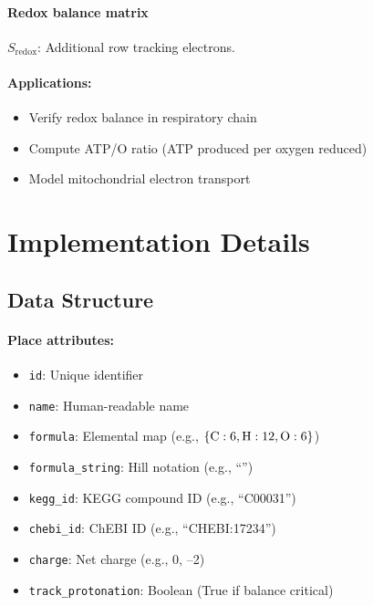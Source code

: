 \paragraph{Redox balance matrix} $S_{\text{redox}}$: Additional row tracking electrons.

\paragraph{Applications:}
\begin{itemize}
    \item Verify redox balance in respiratory chain
    \item Compute ATP/O ratio (ATP produced per oxygen reduced)
    \item Model mitochondrial electron transport
\end{itemize}

\section{Implementation Details}
\label{sec:formula-implementation}

\subsection{Data Structure}
\label{subsec:formula-data-structure}

\paragraph{Place attributes:}
\begin{itemize}
    \item \texttt{id}: Unique identifier
    \item \texttt{name}: Human-readable name
    \item \texttt{formula}: Elemental map (e.g., $\{\ce{C}: 6, \ce{H}: 12, \ce{O}: 6\}$)
    \item \texttt{formula\_string}: Hill notation (e.g., ``'')
    \item \texttt{kegg\_id}: KEGG compound ID (e.g., ``C00031'')
    \item \texttt{chebi\_id}: ChEBI ID (e.g., ``CHEBI:17234'')
    \item \texttt{charge}: Net charge (e.g., 0, --2)
    \item \texttt{track\_protonation}: Boolean (True if  balance critical)
\end{itemize}

